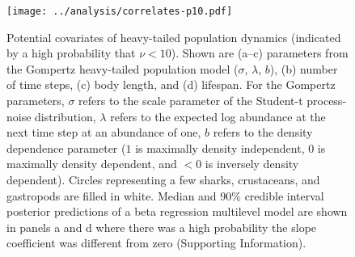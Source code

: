 \begin{figure}[htbp]
\begin{center}
\texttt{[image: ../analysis/correlates-p10.pdf]}
\caption{
Potential covariates of heavy-tailed population dynamics (indicated by a high probability that $\nu < 10$). Shown are (a--c) parameters from the Gompertz heavy-tailed population model ($\sigma$, $\lambda$, $b$), (b) number of time steps, (c) body length, and (d) lifespan. For the Gompertz parameters, $\sigma$ refers to the scale parameter of the Student-t process-noise distribution, $\lambda$ refers to the expected log abundance at the next time step at an abundance of one, $b$ refers to the density dependence parameter ($1$ is maximally density independent, $0$ is maximally density dependent, and $<0$ is inversely density dependent). Circles representing a few sharks, crustaceans, and gastropods are filled in white. Median and 90\% credible interval posterior predictions of a beta regression multilevel model are shown in panels a and d where there was a high probability the slope coefficient was different from zero (Supporting Information).
}
\label{fig:correlates}
\end{center}
\end{figure}
